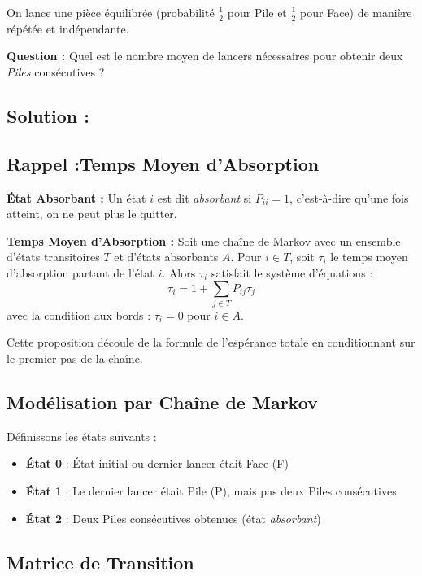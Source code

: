 \begin{exerciseBox}
On lance une pièce équilibrée (probabilité $\frac{1}{2}$ pour Pile et $\frac{1}{2}$ pour Face) de manière répétée et indépendante. 

\textbf{Question :} Quel est le nombre moyen de lancers nécessaires pour obtenir deux \textit{Piles} consécutives ?
\end{exerciseBox}



\subsection*{Solution :}


\subsection*{Rappel :Temps Moyen d'Absorption}

\textbf{État Absorbant :}
Un état $i$ est dit \textit{absorbant} si $P_{ii} = 1$, c'est-à-dire qu'une fois atteint, on ne peut plus le quitter.

\textbf{Temps Moyen d'Absorption :}
Soit une chaîne de Markov avec un ensemble d'états transitoires $T$ et d'états absorbants $A$. Pour $i \in T$, soit $\tau_i$ le temps moyen d'absorption partant de l'état $i$. Alors $\tau_i$ satisfait le système d'équations :
\[
\tau_i = 1 + \sum_{j \in T} P_{ij} \tau_j
\]
avec la condition aux bords : $\tau_i = 0$ pour $i \in A$.

Cette proposition découle de la formule de l'espérance totale en conditionnant sur le premier pas de la chaîne.


\subsection*{Modélisation par Chaîne de Markov}

Définissons les états suivants :
\begin{itemize}
    \item \textbf{État 0} : État initial ou dernier lancer était Face (F)
    \item \textbf{État 1} : Le dernier lancer était Pile (P), mais pas deux Piles consécutives
    \item \textbf{État 2} : Deux Piles consécutives obtenues (état \textit{absorbant})
\end{itemize}

\subsection*{Matrice de Transition}

